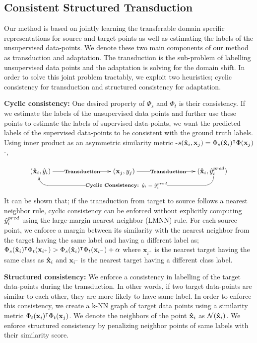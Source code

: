 \subsection{Consistent Structured Transduction}
Our method is based on jointly learning the transferable domain specific representations for source and target points as well as estimating the labels of the unsupervised data-points. We denote these two main components of our method as transduction and adaptation. The transduction is the sub-problem of labelling unsupervised data points and the adaptation is solving for the domain shift. In order to solve this joint problem tractably, we exploit two heuristics; cyclic consistency for transduction and structured consistency for adaptation. 

\textbf{Cyclic consistency:} One desired property of  $\Phi_s$ and $\Phi_t$ is their consistency. If we estimate the labels of the unsupervised data points and further use these points to estimate the labels of supervised data-points, we want the predicted labels of the supervised data-points to be consistent with the ground truth labels. Using inner product as an asymmetric similarity metric -$s(\mathbf{\hat{x}}_i, \mathbf{x}_j) = \Phi_s(\mathbf{\hat{x}}_i)^\intercal \Phi(\mathbf{x}_j)$-,

\begin{displaymath}
    \xymatrix{
        (\xsi,\ysi) \ar@{<-}@<-2pt>`d[r] `[rrrrrr]|{\textbf{Cyclic Consistency: $\ysi = \ysi^{pred}$}} [rrrrrr]  \ar[rrr]|{\textbf{Transduction}}     &&& (\xuj, \yuj) \ar[rrr]|{\textbf{Transduction}} &&&  (\xsi,\ysi^{pred}) }
\end{displaymath}

It can be shown that; if the transduction from target to source follows a nearest neighbor rule, cyclic consistency can be enforced without explicitly computing $\hat{y}_i^{pred}$ using the large-margin nearest neighbor (LMNN)\cite{lmnn} rule. For each source point, we enforce a margin between its similarity with the nearest neighbor from the target having the same label and having a different label as; $ \Phi_s(\mathbf{\hat{x}}_i)^\intercal \Phi_t(\mathbf{x}_{i^+}) > \Phi_s(\mathbf{\hat{x}}_i)^\intercal \Phi_t(\mathbf{x}_{i^-}) + \alpha$ where $\mathbf{x}_{i^+}$ is the nearest target having the same class as $\mathbf{\hat{x}}_i$ and $\mathbf{x}_{i^-}$ is the nearest target having a different class label. 


\textbf{Structured consistency:} We enforce a consistency in labelling of the target data-points during the transduction. In other words, if two target data-points are similar to each other, they are more likely to have same label. In order to enforce this consistency, we create a k-NN graph of target data points using a similarity metric $\Phi_t(\mathbf{x}_i)^\intercal \Phi_t(\mathbf{x}_j)$. We denote the neighbors of the point $\mathbf{\hat{x}}_i$ as $\mathcal{N}(\mathbf{\hat{x}}_i)$. We enforce structured consistency by penalizing neighbor points of same labels with their similarity score. 

